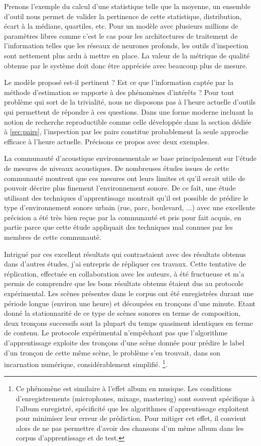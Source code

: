   Prenons l'exemple du calcul d'une statistique telle que la moyenne, un ensemble d'outil nous permet de valider la pertinence de cette statistique, distribution, écart à la médiane, quartiles, etc. Pour un modèle avec plusieurs millions de paramètres libres comme c'est le cas pour les architectures de traitement de l'information telles que les réseaux de neurones profonds, les outils d'inspection sont nettement plus ardu à mettre en place. La valeur de la métrique de qualité obtenue par le système doit donc être appréciée avec beaucoup plus de mesure.

  Le modèle proposé est-il pertinent ? Est ce que l'information captée par la méthode d'estimation se rapporte à des phénomènes d'intérêts ? Pour tout problème qui sort de la trivialité, nous ne disposons pas à l'heure actuelle d'outils qui permettent de répondre à ces questions. Dans une forme moderne incluant la notion de recherche reproductible comme celle développée dans la section dédiée à \ref{sec:pairs}, l'inspection par les pairs constitue probablement la seule approche efficace à l'heure actuelle. Précisons ce propos avec deux exemples.

  La communauté d'acoustique environnementale se base principalement sur l'étude de mesures de niveaux acoustiques. De nombreuses études issues de cette communauté montrent que ces mesures ont leurs limites\cite{lavandier2006contribution} et qu'il serait utile de pouvoir décrire plus finement l'environnement sonore. De ce fait, une étude utilisant des techniques d'apprentissage montrait qu'il est possible de prédire le type d'environnement sonore urbain (rue, parc, boulevard, ...) avec une excellente précision\cite{aucouturier2007bag} a été très bien reçue par la communauté et pris pour fait acquis, en partie parce que cette étude appliquait des techniques mal connues par les membres de cette communauté.

  Intrigué par ces excellent résultats qui contrastaient avec des résultats obtenus dans d'autres études, j'ai entrepris de répliquer ces travaux. Cette tentative de réplication, effectuée en collaboration avec les auteurs, à été fructueuse et m'a permis de comprendre que les bons résultats obtenus étaient dus au protocole expérimental\cite{lagrange2015}. Les scènes présentes dans le corpus ont été enregistrées durant une période longue (environ une heure) et découpées en tronçons d'une minute. Etant donné la stationnarité de ce type de scènes sonores en terme de composition, deux tronçons successifs sont la plupart du temps quasiment identiques en terme de contenu. Le protocole expérimental n'empêchant pas que l'algorithme d'apprentissage exploite des tronçons d'une scène donnée pour prédire le label d'un tronçon de cette même scène, le problème s'en trouvait, dans son incarnation numérique, considérablement simplifié. \footnote{Ce phénomène est similaire à l'effet \og album \fg en musique. Les conditions d'enregistrements (microphones, mixage, mastering) sont souvent spécifique à l'album enregistré, spécificité que les algorithmes d'apprentissage exploitent pour minimiser leur erreur de prédiction. Pour mitiger cet effet, il convient alors de ne pas permettre d'avoir des chansons d'un même album dans les corpus d'apprentissage et de test.}.

